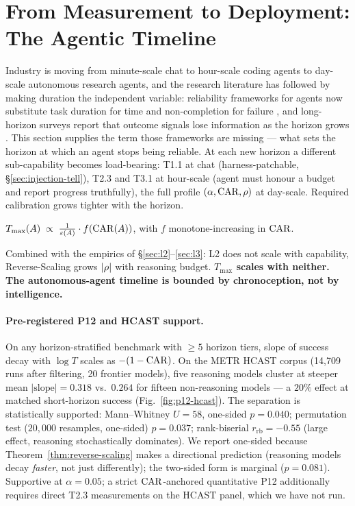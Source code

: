 
\section{From Measurement to Deployment: The Agentic Timeline}
\label{sec:agentic-timeline}

Industry is moving from minute-scale chat to hour-scale coding agents to
day-scale autonomous research agents, and the research literature has followed
by making duration the independent variable: reliability frameworks for agents
now substitute task duration for time and non-completion for failure
\citep{khanal2026reliability}, and long-horizon surveys report that outcome
signals lose information as the horizon grows \citep{chen2026horizongap}. This
section supplies the term those frameworks are missing --- what sets the
horizon at which an agent stops being reliable. At each new horizon a different sub-capability becomes load-bearing: T1.1 at chat (harness-patchable, \S\ref{sec:injection-tell}), T2.3 and T3.1 at hour-scale (agent must honour a budget and report progress truthfully), the full profile $(\alpha, \mathrm{CAR}, \rho)$ at day-scale. Required calibration grows tighter with the horizon.

\begin{hypothesis}
\label{hyp:agentic-timeline}
$T_{\max}(A) \;\propto\; \frac{1}{\varepsilon(A)} \cdot f(\mathrm{CAR}(A))$, with $f$ monotone-increasing in $\mathrm{CAR}$.
\end{hypothesis}

Combined with the empirics of \S\ref{sec:l2}--\ref{sec:l3}: L2 does not scale with capability, Reverse-Scaling grows $|\rho|$ with reasoning budget. \textbf{$T_{\max}$ scales with neither. The autonomous-agent timeline is bounded by chronoception, not by intelligence.}

\paragraph{Pre-registered P12 and HCAST support.}
On any horizon-stratified benchmark with $\geq 5$ horizon tiers, slope of success decay with $\log T$ scales as $-(1 - \mathrm{CAR})$. On the METR HCAST corpus (14{,}709 runs after filtering, 20 frontier models), five reasoning models cluster at steeper mean $|\text{slope}| = 0.318$ vs.\ $0.264$ for fifteen non-reasoning models --- a $20\%$ effect at matched short-horizon success (Fig.~\ref{fig:p12-hcast}). The separation is statistically supported: Mann--Whitney $U = 58$, one-sided $p = 0.040$; permutation test ($20{,}000$ resamples, one-sided) $p = 0.037$; rank-biserial $r_{\text{rb}} = -0.55$ (large effect, reasoning stochastically dominates). We report one-sided because Theorem~\ref{thm:reverse-scaling} makes a directional prediction (reasoning models decay \emph{faster}, not just differently); the two-sided form is marginal ($p = 0.081$). Supportive at $\alpha = 0.05$; a strict $\mathrm{CAR}$-anchored quantitative P12 additionally requires direct T2.3 measurements on the HCAST panel, which we have not run.

